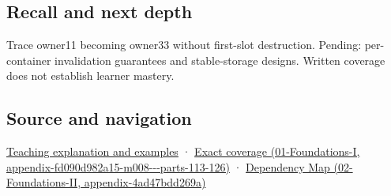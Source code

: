 \subsection{Recall and next depth}\label{appendix-f9b8b9188c7f-recall-and-next-depth}

Trace owner11 becoming owner33 without first-slot destruction. Pending: per-container invalidation guarantees and stable-storage designs. Written coverage does not establish learner mastery.

\subsection{Source and navigation}\label{appendix-f9b8b9188c7f-source-and-navigation}

\hyperref[05-engine-i-ch003-when-a-valid-borrow-stops-naming-the-intended-thing]{Teaching explanation and examples} · \href{../01-Foundations-I/main.pdf\#nameddest=appendix-fd090d982a15-m008---parts-113-126}{Exact coverage (01-Foundations-I, appendix-fd090d982a15-m008-\/-\/-parts-113-126)} · \href{../02-Foundations-II/main.pdf\#nameddest=appendix-4ad47bdd269a}{Dependency Map (02-Foundations-II, appendix-4ad47bdd269a)}
